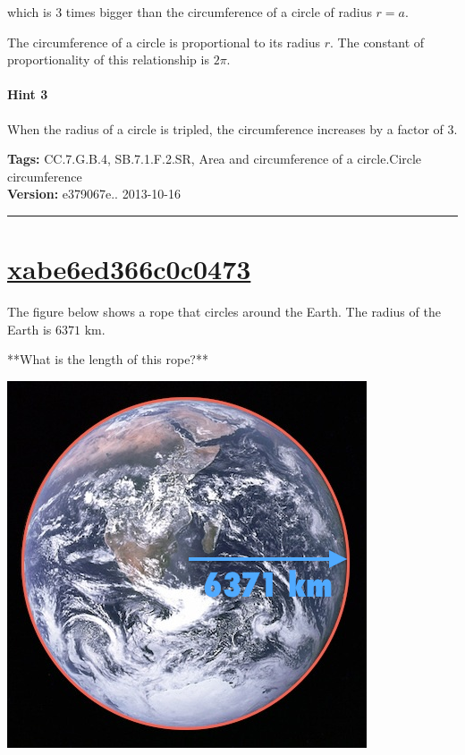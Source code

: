 \documentclass[twocolumn,10pt]{article}
\def\shrinkfactor{0.45}
\begin{document}
which is $3$ times bigger than the circumference of a circle of radius $r=a$. 

The circumference of a circle is proportional to its radius $r$. The constant of proportionality of this relationship is $2\pi$.

\paragraph{Hint 3}When the radius of a circle is tripled, the circumference increases by a factor of $3$.



\medskip
\noindent
\textbf{Tags:} {\footnotesize CC.7.G.B.4, SB.7.1.F.2.SR, Area and circumference of a circle.Circle circumference}\\
\textbf{Version:} e379067e.. 2013-10-16
\smallskip\hrule





\section{\href{https://www.khanacademy.org/devadmin/content/items/xabe6ed366c0c0473}{xabe6ed366c0c0473}}

\noindent
The figure below shows a rope that circles around the Earth. The radius of the Earth is $6371\text{ km}$.

**What is the length of this rope?**


\includegraphics[scale=\shrinkfactor]{figures/b13ca0ce2e95cd21069652083e018a8c654aafe8.png}
\end{document}
